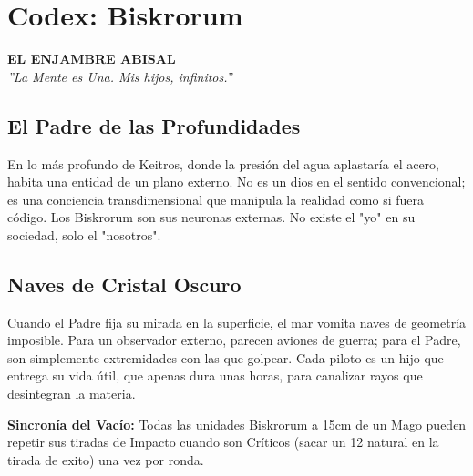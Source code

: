 \chapter*{Codex: Biskrorum}
\begin{center}
    {\Huge \textbf{EL ENJAMBRE ABISAL}} \\
    \vspace{0.5cm}
    {\large \textit{''La Mente es Una. Mis hijos, infinitos.''}}
\end{center}

\section*{El Padre de las Profundidades}
En lo más profundo de Keitros, donde la presión del agua aplastaría el acero, habita una entidad de un plano externo. No es un dios en el sentido convencional; es una conciencia transdimensional que manipula la realidad como si fuera código. Los Biskrorum son sus neuronas externas. No existe el "yo" en su sociedad, solo el "nosotros".

\section*{Naves de Cristal Oscuro}
Cuando el Padre fija su mirada en la superficie, el mar vomita naves de geometría imposible. Para un observador externo, parecen aviones de guerra; para el Padre, son simplemente extremidades con las que golpear. Cada piloto es un hijo que entrega su vida útil, que apenas dura unas horas, para canalizar rayos que desintegran la materia.

\begin{tcolorbox}[colback=VoidPurple!5, colframe=VoidPurple, title=PASIVA DE FACCIÓN: ENLACE NEURONAL]
\textbf{Sincronía del Vacío:} Todas las unidades Biskrorum a 15cm de un Mago pueden repetir sus tiradas de Impacto cuando son Críticos (sacar un 12 natural en la tirada de exito) una vez por ronda.
\end{tcolorbox}